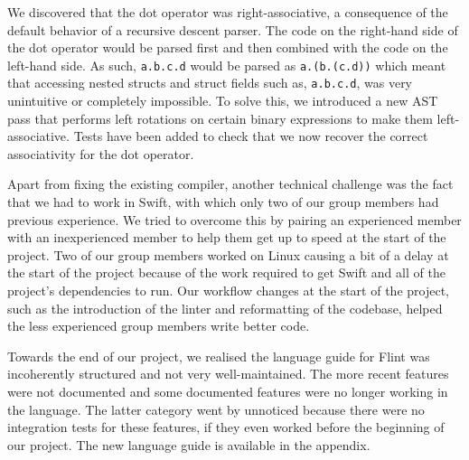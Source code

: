 \inputminted{swift}{code/events.flint}

We discovered that the dot operator was right-associative, a consequence of the default behavior of a recursive descent parser. The code on the right-hand side of the dot operator would be parsed first and then combined with the code on the left-hand side. As such, \texttt{a.b.c.d} would be parsed as \texttt{a.(b.(c.d))} which meant that accessing nested structs and struct fields such as, \texttt{a.b.c.d}, was very unintuitive or completely impossible. To solve this, we introduced a new AST pass that performs left rotations on certain binary expressions to make them left-associative. Tests have been added to check that we now recover the correct associativity for the dot operator.

Apart from fixing the existing compiler, another technical challenge was the fact that we had to work in Swift, with which only two of our group members had previous experience. We tried to overcome this by pairing an experienced member with an inexperienced member to help them get up to speed at the start of the project. Two of our group members worked on Linux causing a bit of a delay at the start of the project because of the work required to get Swift and all of the project's dependencies to run. Our workflow changes at the start of the project, such as the introduction of the linter and reformatting of the codebase, helped the less experienced group members write better code.

Towards the end of our project, we realised the language guide for Flint was incoherently structured and not very well-maintained. The more recent features were not documented and some documented features were no longer working in the language. The latter category went by unnoticed because there were no integration tests for these features, if they even worked before the beginning of our project. The new language guide is available in the appendix.
